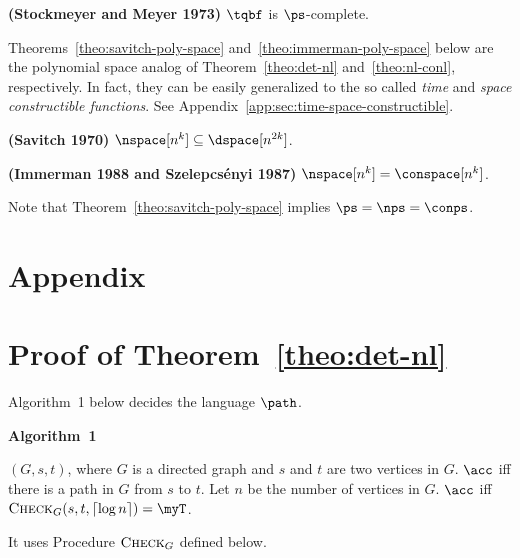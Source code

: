 \documentclass[11pt, a4paper]{article}
\begin{document}
{{\begin{theorem}
\label{theo:tqbf}
{\bf (Stockmeyer and Meyer 1973)}
$\tqbf$ is $\ps$-complete.
\end{theorem}

Theorems~\ref{theo:savitch-poly-space} and~\ref{theo:immerman-poly-space} below are 
the polynomial space analog of Theorem~\ref{theo:det-nl} and~\ref{theo:nl-conl}, respectively.
In fact, they can be easily generalized to the so called {\em time} and {\em space constructible functions}.
See Appendix~\ref{app:sec:time-space-constructible}.

\begin{theorem}
\label{theo:savitch-poly-space}
{\bf (Savitch 1970)}
$\nspace [n^k] \subseteq \dspace [n^{2k}]$.
\end{theorem}

\begin{theorem}
\label{theo:immerman-poly-space}
{\bf (Immerman 1988 and Szelepcs\'{e}nyi 1987)}
$\nspace[n^k]=\conspace[n^k]$.
\end{theorem}

Note that Theorem~\ref{theo:savitch-poly-space} implies $\ps=\nps=\conps$.



\newpage

\appendix

\section*{Appendix}


\section{Proof of Theorem~\ref{theo:det-nl}}
\label{app:det-nl}


Algorithm~1 below decides the language $\path$.
\begin{algorithm}[h!]
\label{alg:savitch}
\caption{\bf Algorithm~1}
\begin{algorithmic}[1]
\REQUIRE
$(G,s,t)$, where $G$ is a directed graph and $s$ and $t$ are two vertices in $G$.
\ENSURE
$\acc$ iff there is a path in $G$ from $s$ to $t$. 
\STATE
Let $n$ be the number of vertices in $G$.
\STATE
$\acc$ iff $\textsc{Check}_{G}(s,t,\lceil \log n\rceil)=\myT$.
\end{algorithmic}
\end{algorithm}

It uses Procedure $\textsc{Check}_G$ defined below.

}}
\end{document}

